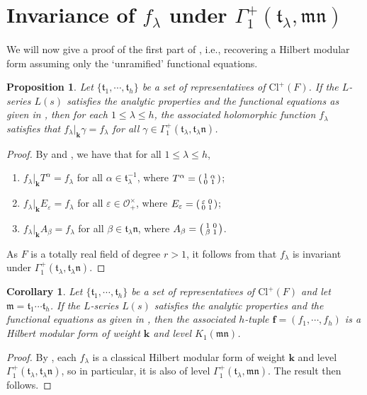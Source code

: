 \documentclass[11pt]{amsart}
\newtheorem{prop}[theorem]{Proposition}
\newtheorem{corol}[theorem]{Corollary}
\theoremstyle{remark}
\newcommand\sm[1]{\begin{psmallmatrix}#1\end{psmallmatrix}}
\newcommand\mbf[1]{\mathbf{#1}}
\newcommand\fr[1]{\mathfrak{#1}}
\newcommand{\eps}{\varepsilon}
\newcommand{\clo}{\mathcal{O}}
\newcommand{\Cl}{\mathrm{Cl}}
\begin{document}
\section{Invariance of $f_\lambda$ under $\Gamma_1^+(\fr{t}_\lambda,\fr{m}\fr{n})$}
\label{gamma1-inv}

We will now give a proof of the first part of , i.e., recovering a Hilbert modular form assuming only the `unramified' functional equations.

\begin{prop}
\label{f_lambda-gamma1-inv}
Let $\{\fr{t}_1,\cdots,\fr{t}_h\}$ be a set of representatives of $\Cl^+(F)$. If the $L$-series $L(s)$ satisfies the analytic properties and the functional equations as given in , then for each \mbox{$1\leq\lambda\leq h$}, the associated holomorphic function $f_\lambda$ satisfies that $f_\lambda|_\mbf{k}\gamma=f_\lambda$ for all $\gamma\in\Gamma_1^+(\fr{t}_\lambda,\fr{t}_\lambda\fr{n})$.
\end{prop}
\begin{proof}
By  and , we have that for all $1\leq\lambda\leq h$,
\begin{enumerate}[label=\rm{(\alph*)}]
    \item $f_\lambda|_\mbf{k}T^\alpha=f_\lambda$ for all $\alpha\in\fr{t}_\lambda^{-1}$, where $T^\alpha=\sm{1&\alpha\\0&1}$;
    \item $f_\lambda|_\mbf{k}E_\eps=f_\lambda$ for all $\eps\in\clo_+^\times$, where $E_\eps=\sm{\eps&0\\0&1}$;
    \item $f_\lambda|_\mbf{k}A_\beta=f_\lambda$ for all $\beta\in\fr{t}_\lambda\fr{n}$, where $A_\beta=\sm{1&0\\\beta&1}$. 
\end{enumerate}
As $F$ is a totally real field of degree $r>1$, it follows from  that $f_\lambda$ is invariant under $\Gamma_1^+(\fr{t}_\lambda,\fr{t}_\lambda\fr{n})$. 
\end{proof}

\begin{corol}
\label{f-gamma1-inv}
Let $\{\fr{t}_1,\cdots,\fr{t}_h\}$ be a set of representatives of $\Cl^+(F)$ and let $\fr{m}=\fr{t}_1\cdots\fr{t}_h$. If the $L$-series $L(s)$ satisfies the analytic properties and the functional equations as given in , then the associated $h$-tuple $\mbf{f}=(f_1,\cdots,f_h)$ is a Hilbert modular form of weight $\mbf{k}$ and level $K_1(\fr{mn})$.
\end{corol}
\begin{proof}
By , each $f_\lambda$ is a classical Hilbert modular form of weight $\mbf{k}$ and level $\Gamma_1^+(\fr{t}_\lambda,\fr{t}_\lambda\fr{n})$, so in particular, it is also of level $\Gamma_1^+(\fr{t}_\lambda,\fr{m}\fr{n})$. The result then follows.
\end{proof}
\end{document}
